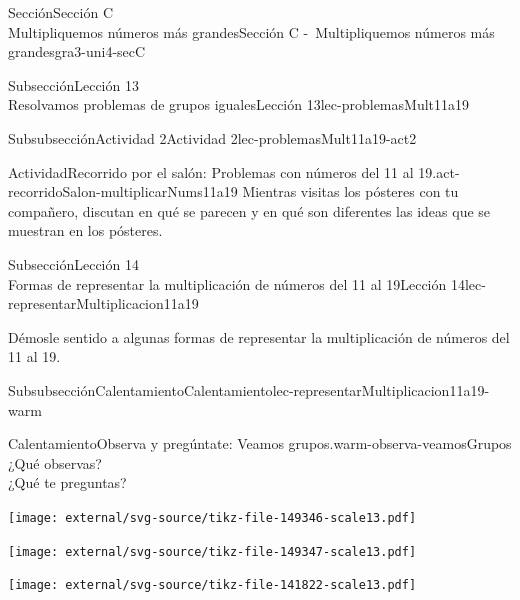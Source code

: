 \begin{sectionptx}{Sección}{{\Large Sección C\\}Multipliquemos números más grandes}{}{Sección C -~Multipliquemos números más grandes}{}{}{gra3-uni4-secC}
\begin{subsectionptx}{Subsección}{{\normalsize Lección 13\\[-0.05cm]}Resolvamos problemas de grupos iguales}{}{Lección 13}{}{}{lec-problemasMult11a19}
\typeout{************************************************}
%
\vspace{-0.2cm}
\begin{subsubsectionptx}{Subsubsección}{Actividad 2}{}{Actividad 2}{}{}{lec-problemasMult11a19-act2}
\begin{activity}{Actividad}{Recorrido por el salón: Problemas con números del 11 al 19.}{act-recorridoSalon-multiplicarNums11a19}%
Mientras visitas los pósteres con tu compañero, discutan en qué se parecen y en qué son diferentes las ideas que se muestran en los pósteres.%
\end{activity}%
\end{subsubsectionptx}
\end{subsectionptx}
%
%
\typeout{************************************************}
\typeout{************************************************}
%
\begin{subsectionptx}{Subsección}{{\normalsize Lección 14\\[-0.05cm]}Formas de representar la multiplicación de números del 11 al 19}{}{Lección 14}{}{}{lec-representarMultiplicacion11a19}
\begin{introduction}{}%
Démosle sentido a algunas formas de representar la multiplicación de números del 11 al 19.%
\end{introduction}%
%
%
\typeout{************************************************}
\typeout{************************************************}
%
\begin{subsubsectionptx}{Subsubsección}{Calentamiento}{}{Calentamiento}{}{}{lec-representarMultiplicacion11a19-warm}
\begin{exploration}{Calentamiento}{Observa y pregúntate: Veamos grupos.}{warm-observa-veamosGrupos}%
¿Qué observas?\\
 ¿Qué te preguntas?%
\begin{sidebyside}{3}{0}{0}{0}%
\begin{sbspanel}{0.333333333333333}%
\texttt{[image: external/svg-source/tikz-file-149346-scale13.pdf]}
\end{sbspanel}%
\begin{sbspanel}{0.333333333333333}%
\texttt{[image: external/svg-source/tikz-file-149347-scale13.pdf]}
\end{sbspanel}%
\begin{sbspanel}{0.333333333333333}%
\texttt{[image: external/svg-source/tikz-file-141822-scale13.pdf]}

\end{sbspanel}
\end{sidebyside}
\end{exploration}
\end{subsubsectionptx}
\end{subsectionptx}
\end{sectionptx}
